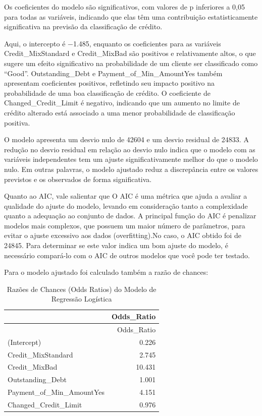\documentclass[
  letterpaper,
  DIV=11,
  numbers=noendperiod]{scrreprt}
\begin{document}
Os coeficientes do modelo são significativos, com valores de p
inferiores a 0,05 para todas as variáveis, indicando que elas têm uma
contribuição estatisticamente significativa na previsão da classificação
de crédito.

Aqui, o intercepto é −1.485, enquanto os coeficientes para as variáveis
Credit\_MixStandard e Credit\_MixBad são positivos e relativamente
altos, o que sugere um efeito significativo na probabilidade de um
cliente ser classificado como ``Good''. Outstanding\_Debt e
Payment\_of\_Min\_AmountYes também apresentam coeficientes positivos,
refletindo seu impacto positivo na probabilidade de uma boa
classificação de crédito. O coeficiente de Changed\_Credit\_Limit é
negativo, indicando que um aumento no limite de crédito alterado está
associado a uma menor probabilidade de classificação positiva.

O modelo apresenta um desvio nulo de 42604 e um desvio residual de
24833. A redução no desvio residual em relação ao desvio nulo indica que
o modelo com as variáveis independentes tem um ajuste significativamente
melhor do que o modelo nulo. Em outras palavras, o modelo ajustado reduz
a discrepância entre os valores previstos e os observados de forma
significativa.

Quanto ao AIC, vale salientar que O AIC é uma métrica que ajuda a
avaliar a qualidade do ajuste do modelo, levando em consideração tanto a
complexidade quanto a adequação ao conjunto de dados. A principal função
do AIC é penalizar modelos mais complexos, que possuem um maior número
de parâmetros, para evitar o ajuste excessivo aos dados (overfitting).No
caso, o AIC obtido foi de 24845. Para determinar se este valor indica um
bom ajuste do modelo, é necessário compará-lo com o AIC de outros
modelos que você pode ter testado.

Para o modelo ajustado foi calculado também a razão de chances:

\begin{longtable}[]{@{}lr@{}}
\caption{Razões de Chances (Odds Ratios) do Modelo de Regressão
Logística}\tabularnewline
\toprule\noalign{}
& Odds\_Ratio \\
\midrule\noalign{}
\endfirsthead
\toprule\noalign{}
& Odds\_Ratio \\
\midrule\noalign{}
\endhead
\bottomrule\noalign{}
\endlastfoot
(Intercept) & 0.226 \\
Credit\_MixStandard & 2.745 \\
Credit\_MixBad & 10.431 \\
Outstanding\_Debt & 1.001 \\
Payment\_of\_Min\_AmountYes & 4.151 \\
Changed\_Credit\_Limit & 0.976 \\
\end{longtable}
\end{document}
